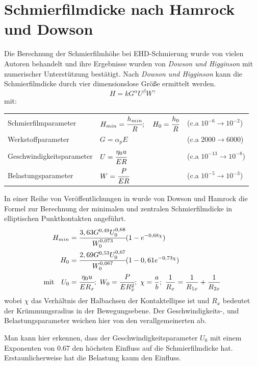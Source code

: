 \section{Schmierfilmdicke nach Hamrock und Dowson}
\label{sec:schmierfilmdicke_nach_hamrock_und_dowson}

Die Berechnung der Schmierfilmhöhe bei EHD-Schmierung wurde von vielen Autoren behandelt und ihre Ergebnisse wurden von \textit{Dowson und Higginson} mit numerischer Unterstützung bestätigt.
Nach \textit{Dowson und Higginson} kann die Schmierfilmdicke durch vier dimensionslose Größe ermittelt werden.
\begin{equation}
    \label{eq:allgemein_schmierfilmdicke}
    H = k G^{\alpha} U^{\beta} W^{\gamma}
\end{equation}
%
mit:

\begin{tabular}{lll}
    Schmierfilmparameter      & $H_{min} = \cfrac{h_{min}}{R} ;\quad H_0 = \cfrac{h_0}{R}$ & (c.a $10^{-6} \rightarrow 10^{-2}$)   \\
    Werkstoffparameter        & $G = \alpha_p E$                                           & (c.a $2000 \rightarrow 6000$)         \\
    Geschwindigkeitsparameter & $U = \cfrac{\eta_0 u}{E R}$                                & (c.a $10^{-13} \rightarrow 10 ^{-8}$) \\
    Belastungsparameter       & $W = \cfrac{P}{E R}$                                       & (c.a $10^{-5} \rightarrow 10^{-3}$)
\end{tabular}
%

In einer Reihe von Veröffentlichungen in \cite{hamrock_dowson_1976_a}\cite{hamrock_dowson_1976_b}\cite{hamrock_dowson_1977_a}\cite{hamrock_dowson_1977_b} wurde von Dowson und Hamrock die Formel zur Berechnung der minimalen und zentralen Schmierfilmdicke in elliptischen Punktkontakten angeführt.
\begin{align}
    \label{eq:mininmale_schmierfilmdicke_downson_hamrock}
    H_{min} &= \cfrac{3,63 G^{0,49} U_0^{0,68}}{W_0^{0,073}} (1 - e^{-0,68 \chi}) \\
    \label{eq:zentrale_schmierfilmdicke_downson_hamrock}
    H_0 &= \cfrac{2,69 G^{0,53} U_0^{0,67}}{W_0^{0,067}} (1 - 0,61 e^{-0,73 \chi}) \\
    \text{mit} \quad
    U_0 &= \cfrac{\eta_0 u}{E R_x};\ 
    W_0 = \cfrac{P}{E R_x^2};\
    \chi = \frac{a}{b};\
    \frac{1}{R_x} = \frac{1}{R_{1x}} + \frac{1}{R_{2x}} \nonumber 
\end{align}
%
wobei $\chi$ das Verhältnis der Halbachsen der Kontaktellipse ist und $R_x$ bedeutet der Krümmungsradius in der Bewegungsebene.
Der Geschwindigkeits-, und Belastungsparameter weichen hier von den verallgemeinerten ab.

Man kann hier erkennen, dass der Geschwindigkeitsparameter $U_0$ mit einem Exponenten von \num{0.67} den höchsten Einfluss auf die Schmierfilmdicke hat.
Erstaunlicherweise hat die Belastung kaum den Einfluss.
